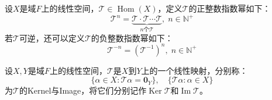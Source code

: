 \begin{definition}
	设$X$是域$F$上的线性空间，$\mathcal{T}\in\operatorname{Hom}(X)$，定义$\mathcal{T}$的正整数指数幂如下：
	\begin{equation*}
		\mathcal{T}^n=\underbrace{\mathcal{T} \cdot \mathcal{T} \cdots \mathcal{T}}_{n\text{个}\mathcal{T}}
		,\;n\in \mathbb{N}^+
	\end{equation*}
	若$\mathcal{T}$可逆，还可以定义$\mathcal{T}$的负整数指数幂如下：
	\begin{equation*}
		\mathcal{T}^{-n}=(\mathcal{T}^{-1})^n,\;n\in\mathbb{N}^+
	\end{equation*}
\end{definition}
\begin{definition}
	设$X,Y$是域$F$上的线性空间，$\mathcal{T}$是$X$到$Y$上的一个线性映射，分别称：
	\begin{equation*}
		\{\alpha\in X:\mathcal{T}\alpha=\mathbf{0}_Y\},\quad
		\{\mathcal{T}\alpha:\alpha\in X\}
	\end{equation*}
	为$\mathcal{T}$的\gls{Kernel}与\gls{Image}，将它们分别记作$\operatorname{Ker}\mathcal{T}$和$\operatorname{Im}\mathcal{T}$。
\end{definition}
